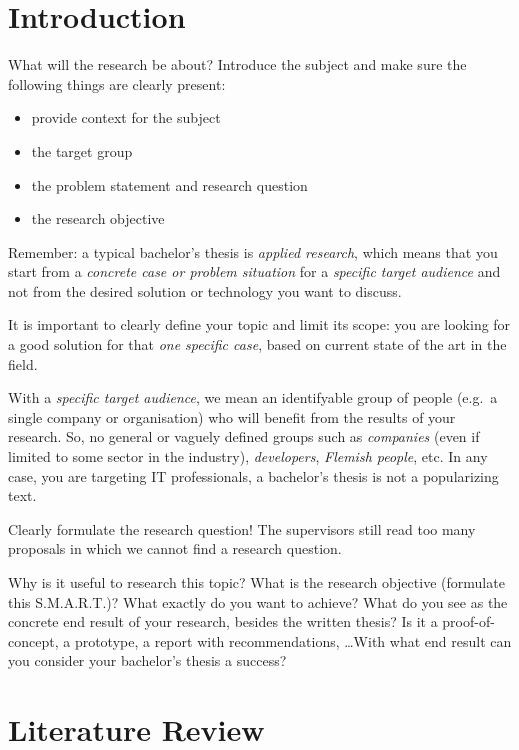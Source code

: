 \documentclass[english]{hogent-article}
\begin{document}
\section{Introduction}%
\label{sec:Introduction}

What will the research be about? Introduce the subject and make sure the following things are clearly present:

\begin{itemize}
  \item provide context for the subject
  \item the target group
  \item the problem statement and research question
  \item the research objective
\end{itemize}

Remember: a typical bachelor's thesis is \emph{applied research}, which means that you start from a \emph{concrete case or problem situation} for a \emph{specific target audience} and not from the desired solution or technology you want to discuss.

It is important to clearly define your topic and limit its scope: you are looking for a good solution for that \textit{one specific case}, based on current state of the art in the field.

With a \emph{specific target audience}, we mean an identifyable group of people (e.g.\ a single company or organisation) who will benefit from the results of your research. So, no general or vaguely defined groups such as \emph{companies} (even if limited to some sector in the industry), \emph{developers}, \emph{Flemish people}, etc. In any case, you are targeting IT professionals, a bachelor's thesis is not a popularizing text.

Clearly formulate the research question! The supervisors still read too many proposals in which we cannot find a research question.

Why is it useful to research this topic? What is the research objective (formulate this S.M.A.R.T.)? What exactly do you want to achieve? What do you see as the concrete end result of your research, besides the written thesis? Is it a proof-of-concept, a prototype, a report with recommendations, \ldots With what end result can you consider your bachelor's thesis a success?

\section{Literature Review}%
\label{sec:literature review}
\end{document}
